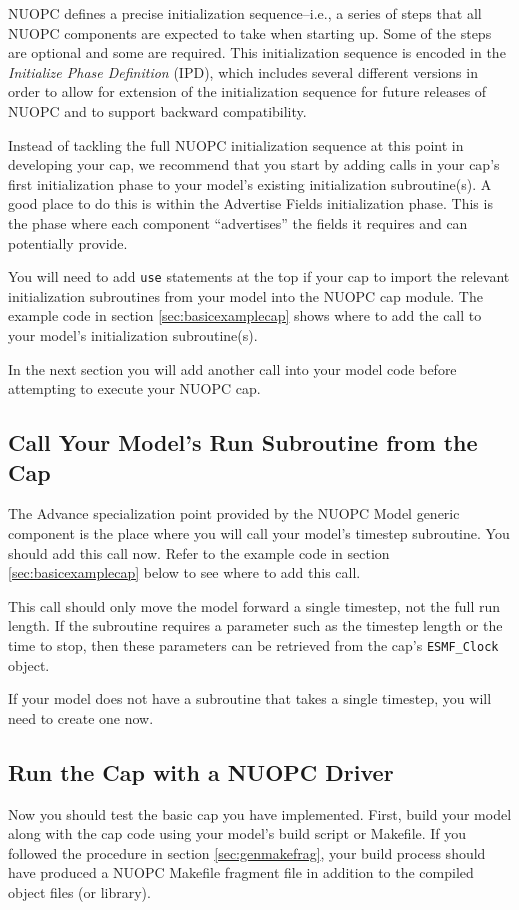 NUOPC defines a precise initialization sequence--i.e., a series of
steps that all NUOPC components are expected to take when starting
up.  Some of the steps are optional and some are required.
This initialization sequence is encoded in the \emph{Initialize Phase
Definition} (IPD), which includes several different versions in
order to allow for extension of the initialization sequence for
future releases of NUOPC and to support backward compatibility.

Instead of tackling the full NUOPC initialization sequence at this point in
developing your cap, we recommend that you start by adding calls in your cap's
first initialization phase to your model's existing initialization subroutine(s).
A good place to do this is within the Advertise Fields initialization phase.
This is the phase where each component ``advertises'' the fields it
requires and can potentially provide.  

You will need to add {\tt use} statements at the top if your cap to import the relevant
initialization subroutines from your model into the NUOPC cap module.
The example code in section \ref{sec:basicexamplecap} shows where to add the 
call to your model's initialization subroutine(s).

In the next section you will add another call into your model code
before attempting to execute your NUOPC cap.


\subsection{Call Your Model's Run Subroutine from the Cap}
\label{sec:callrunfromcap}
The Advance specialization point provided by the NUOPC Model
generic component is the place where you will call your
model's timestep subroutine.  You should add this call now. 
Refer to the example code in section \ref{sec:basicexamplecap} 
below to see where to add this call.

This call should only move the model forward a single timestep,
not the full run length.  If the subroutine requires a parameter 
such as the timestep length or the time to stop, then these 
parameters can be retrieved from the cap's {\tt ESMF\_Clock} object.

If your model does not have a subroutine that takes a single timestep,
you will need to create one now.


\subsection{Run the Cap with a NUOPC Driver}
\label{sec:runcapwithdriver}
Now you should test the basic cap you have implemented. First,
build your model along with the cap code using your model's build
script or Makefile.  If you followed the procedure in section \ref{sec:genmakefrag}, 
your build process should have produced a NUOPC Makefile
fragment file in addition to the compiled object files (or library).

